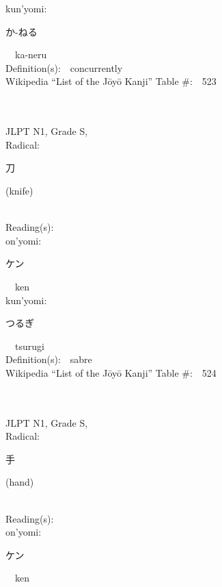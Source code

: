 \begin{multicols}{2}
{\hspace*{1em}}kun'yomi:\ \ \\
{\hspace*{2em}}{\begin{CJK}{UTF8}{min} か-ねる \end{CJK}}\ \ ka-neru\ \ \\
Definition(s):\ \ concurrently \\
Wikipedia ``List of the J\=oy\=o Kanji'' Table \#:\ \ 523 \\
\ \ \\
{\fontsize{34pt}{40pt}  }\ \ \\
{JLPT N1, Grade S, \\Radical:\ \ {\begin{CJK}{UTF8}{min} 刀 \end{CJK}} (knife) } \\
Reading(s):\ \ \\
{\hspace*{1em}}on'yomi:\ \ \\
{\hspace*{2em}}{\begin{CJK}{UTF8}{min} ケン \end{CJK}}\ \ ken\ \ \\
{\hspace*{1em}}kun'yomi:\ \ \\
{\hspace*{2em}}{\begin{CJK}{UTF8}{min} つるぎ \end{CJK}}\ \ tsurugi\ \ \\
Definition(s):\ \ sabre \\
Wikipedia ``List of the J\=oy\=o Kanji'' Table \#:\ \ 524 \\
\ \ \\
{\fontsize{34pt}{40pt}  }\ \ \\
{JLPT N1, Grade S, \\Radical:\ \ {\begin{CJK}{UTF8}{min} 手 \end{CJK}} (hand) } \\
Reading(s):\ \ \\
{\hspace*{1em}}on'yomi:\ \ \\
{\hspace*{2em}}{\begin{CJK}{UTF8}{min} ケン \end{CJK}}\ \ ken\ \ \\

\end{multicols}
